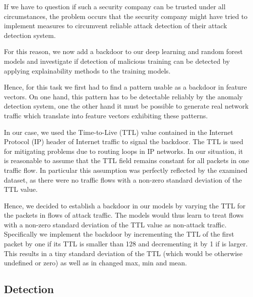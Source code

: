 \documentclass[10pt,sigconf,letterpaper]{acmart}
\begin{document}
If we have to question if such a security company can be trusted under all circumstances, the problem occurs that the security company might have tried to implement measures to circumvent reliable attack detection of their attack detection system. 

For this reason, we now add a backdoor to our deep learning and random forest models and investigate if detection of malicious training can be detected by applying explainability methods to the training models.

Hence, for this task we first had to find a pattern usable as a backdoor in feature vectors. On one hand, this pattern has to be detectable reliably by the anomaly detection system, one the other hand it must be possible to generate real network traffic which translate into feature vectors exhibiting these patterns.

In our case, we used the Time-to-Live (TTL) value contained in the Internet Protocol (IP) header of Internet traffic to signal the backdoor. The TTL is used for mitigating problems due to routing loops in IP networks. In our situation, it is reasonable to assume that the TTL field remains constant for all packets in one traffic flow. In particular this assumption was perfectly reflected by the examined dataset, as there were no traffic flows with a non-zero standard deviation of the TTL value.

Hence, we decided to establish a backdoor in our models by varying the TTL for the packets in flows of attack traffic.  The models would thus learn to treat flows with a non-zero standard deviation of the TTL value as non-attack traffic. Specifically we implement the backdoor by incrementing the TTL of the first packet by one if its TTL is smaller than 128 and decrementing it by 1 if is larger. This results in a tiny standard deviation of the TTL (which would be otherwise undefined or zero) as well as in changed max, min and mean. 

\subsection{Detection}
\end{document}
